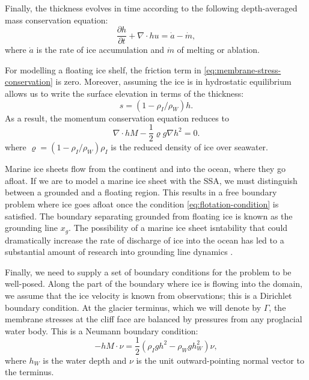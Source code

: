 \documentclass{article}
\theoremstyle{definition}
\theoremstyle{plain}
\begin{document}
Finally, the thickness evolves in time according to the following depth-averaged mass conservation equation:
\begin{equation}
    \frac{\partial h}{\partial t} + \nabla \cdot hu = \dot a - \dot m,
    \label{eq:conservation-mass}
\end{equation}
where $\dot a$ is the rate of ice accumulation and $\dot m$ of melting or ablation.

For modelling a floating ice shelf, the friction term in \eqref{eq:membrane-stress-conservation} is zero.
Moreover, assuming the ice is in hydrostatic equilibrium allows us to write the surface elevation in terms of the thickness:
\begin{equation}
    s = (1 - \rho_I / \rho_W) h.
    \label{eq:flotation-condition}
\end{equation}
As a result, the momentum conservation equation reduces to
\begin{equation}
    \nabla\cdot hM - \frac{1}{2}\varrho g\nabla h^2 = 0.
\end{equation}
where $\varrho = (1 - \rho_I / \rho_W)\rho_I$ is the reduced density of ice over seawater.

Marine ice sheets flow from the continent and into the ocean, where they go afloat.
If we are to model a marine ice sheet with the SSA, we must distinguish between a grounded and a floating region.
This results in a free boundary problem where ice goes afloat once the condition \eqref{eq:flotation-condition} is satisfied.
The boundary separating grounded from floating ice is known as the grounding line $x_g$.
The possibility of a marine ice sheet isntability that could dramatically increase the rate of discharge of ice into the ocean has led to a substantial amount of research into grounding line dynamics \citep{schoof2007mis, durand2009mis, favier2012mis}.

Finally, we need to supply a set of boundary conditions for the problem to be well-posed.
Along the part of the boundary where ice is flowing into the domain, we assume that the ice velocity is known from observations; this is a Dirichlet boundary condition.
At the glacier terminus, which we will denote by $\Gamma$, the membrane stresses at the cliff face are balanced by pressures from any proglacial water body.
This is a Neumann boundary condition:
\begin{equation}
    -hM\cdot\nu = \frac{1}{2}\left(\rho_Igh^2 - \rho_Wgh_W^2\right)\nu,
    \label{eq:terminus-bc}
\end{equation}
where $h_W$ is the water depth and $\nu$ is the unit outward-pointing normal vector to the terminus.
\end{document}
